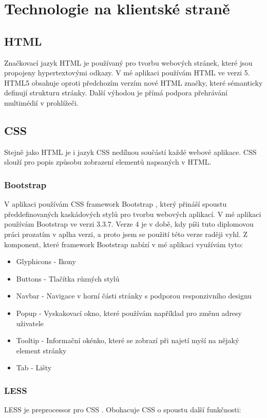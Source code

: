 \section{Technologie na klientské straně}

\subsection{HTML}
Značkovací jazyk HTML je používaný pro tvorbu webových stránek, které jsou propojeny hypertextovými odkazy. V mé aplikaci používám HTML ve verzi 5. HTML5 obsahuje oproti předchozím verzím nové HTML značky, které sémanticky definují strukturu stránky. Další výhodou je přímá podpora přehrávání multimédií v prohlížeči.

\subsection{CSS}
Stejně jako HTML je i jazyk CSS nedílnou součástí každé webové aplikace. CSS slouží pro popis způsobu zobrazení elementů napsaných v HTML.

\subsubsection{Bootstrap}
V aplikaci používám CSS framework Bootstrap \cite{bootstrap}, který přináší spoustu předdefinovaných kaskádových stylů pro tvorbu webových aplikací. V mé aplikaci používám Bootstrap ve verzi 3.3.7. Verze 4 je v době, kdy píši tuto diplomovou práci prozatím v aplha verzi, a proto jsem se použití této verze raději vyhl. Z komponent, které framework Bootstrap nabízí v mé aplikaci využívám tyto:
\begin{itemize}
    \item Glyphicons - Ikony
	\item Buttons - Tlačítka různých stylů
	\item Navbar - Navigace v horní části stránky s podporou responzivního designu
	\item Popup - Vyskakovací okno, které používám například pro změnu adresy uživatele
	\item Tooltip - Informační okénko, které se zobrazí při najetí myší na nějaký element stránky
	\item Tab - Lišty
\end{itemize}

\subsubsection{LESS}
LESS je preprocessor pro CSS \cite{less}. Obohacuje CSS o spoustu další funkčnosti:

